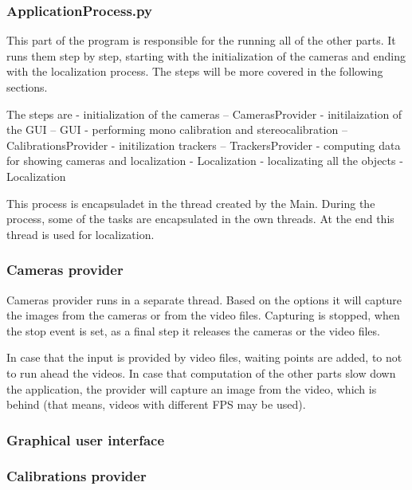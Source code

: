 \subsubsection*{ApplicationProcess.py}

This part of the program is responsible for the running all of the other parts.
It runs them step by step, starting with the initialization of the cameras and
ending with the localization process. The steps will be more covered in the
following sections.

The steps are
- initialization of the cameras -- CamerasProvider
- initilaization of the GUI -- GUI
- performing mono calibration and stereocalibration -- CalibrationsProvider
- initilization trackers -- TrackersProvider
- computing data for showing cameras and localization - Localization
- localizating all the objects - Localization

This process is encapsuladet in the thread created by the Main. During the
process, some of the tasks are encapsulated in the own threads. At the end this
thread is used for localization.

\subsubsection*{Cameras provider}

Cameras provider runs in a separate thread. Based on the options it will
capture the images from the cameras or from the video files. Capturing is
stopped, when the stop event is set, as a final step it releases the cameras or
the video files.

In case that the input is provided by video files, waiting points are added, to
not to run ahead the videos. In case that computation of the other parts slow
down the application, the provider will capture an image from the video, which
is behind (that means, videos with different FPS may be used).


\subsubsection*{Graphical user interface}




\subsubsection*{Calibrations provider}



